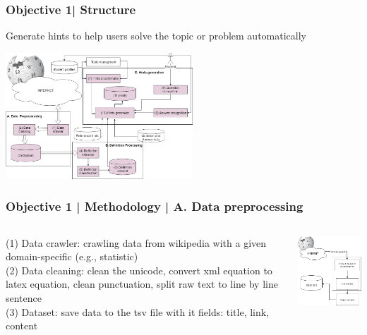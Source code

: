 \documentclass{beamer}
\begin{document}
\begin{frame}
\frametitle{Objective 1| Structure}

Generate hints to help users solve the topic or problem automatically



\begin{center}
			\includegraphics[width=70mm]{23.png}
\end{center}

\end{frame}
\begin{frame}

\frametitle{Objective 1 | Methodology | A. Data preprocessing}
\begin{columns}
\begin{column}{.5\textwidth}

(1) Data crawler: crawling data from wikipedia with a given domain-specific (e.g., statistic)\\

(2) Data cleaning: clean the unicode, convert xml equation to latex equation, clean punctuation, split raw text to line by line sentence\\
(3) Dataset: save data to the tsv file with it fields: title, link, content\\
\end{column}
\begin{column}{.5\textwidth}
		\includegraphics[width=50mm]{cr1.png}
\end{column}

\end{columns}
\end{frame}
\end{document}
